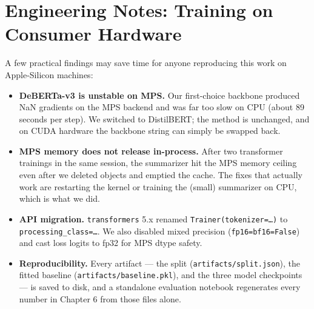 \section{Engineering Notes: Training on Consumer Hardware}
\label{sec:engineering}
A few practical findings may save time for anyone reproducing this work on Apple-Silicon machines:
\begin{itemize}[itemsep=2pt]
  \item \textbf{DeBERTa-v3 is unstable on MPS.} Our first-choice backbone produced NaN gradients on the MPS backend and was far too slow on CPU (about 89 seconds per step). We switched to DistilBERT; the method is unchanged, and on CUDA hardware the backbone string can simply be swapped back.
  \item \textbf{MPS memory does not release in-process.} After two transformer trainings in the same session, the summarizer hit the MPS memory ceiling even after we deleted objects and emptied the cache. The fixes that actually work are restarting the kernel or training the (small) summarizer on CPU, which is what we did.
  \item \textbf{API migration.} \texttt{transformers} 5.x renamed \texttt{Trainer(tokenizer=\dots)} to \texttt{processing\_class=\dots}. We also disabled mixed precision (\texttt{fp16=bf16=False}) and cast loss logits to fp32 for MPS dtype safety.
  \item \textbf{Reproducibility.} Every artifact --- the split (\texttt{artifacts/split.json}), the fitted baseline (\texttt{artifacts/baseline.pkl}), and the three model checkpoints --- is saved to disk, and a standalone evaluation notebook regenerates every number in Chapter 6 from those files alone.
\end{itemize}
